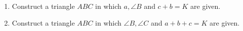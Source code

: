\begin{enumerate}[label=\thesection.\arabic*,ref=\thesection.\theenumi]
\item 
	Construct a triangle $ABC$ in which $a, \angle{B}$ and $c + b  = K$ are given.
\label{cons/tri/1}
	\\
	\solution 

%
\iffalse
\item 
\label{cons/tri/2}

%
\item 
\label{cons/tri/3}

%
\item 
\label{cons/tri/5}

\fi
%
\item Construct a triangle $ABC$ in which $\angle{B}, \angle{C}$ and  $a+b+c=K$ are given.
\label{cons/tri/4}
\\
\solution



\end{enumerate}
